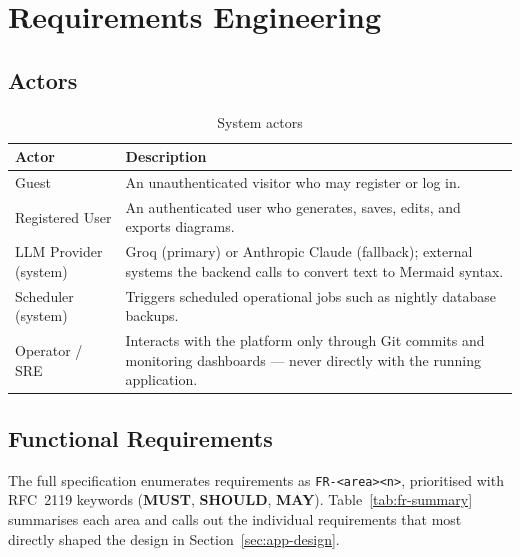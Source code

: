 \documentclass[11pt,a4paper]{article}
\newcommand{\reqid}[1]{\texttt{#1}}
\begin{document}
\section{Requirements Engineering}

\subsection{Actors}
\begin{table}[H]
\centering
\begin{tabularx}{\textwidth}{@{}l Y@{}}
\toprule
\textbf{Actor} & \textbf{Description} \\
\midrule
Guest & An unauthenticated visitor who may register or log in. \\
Registered User & An authenticated user who generates, saves, edits, and
    exports diagrams. \\
LLM Provider (system) & Groq (primary) or Anthropic Claude (fallback);
    external systems the backend calls to convert text to Mermaid syntax. \\
Scheduler (system) & Triggers scheduled operational jobs such as nightly
    database backups. \\
Operator / SRE & Interacts with the platform only through Git commits and
    monitoring dashboards --- never directly with the running application. \\
\bottomrule
\end{tabularx}
\caption{System actors}
\end{table}

\subsection{Functional Requirements}
The full specification enumerates requirements as \reqid{FR-<area><n>},
prioritised with RFC~2119 keywords (\textbf{MUST}, \textbf{SHOULD},
\textbf{MAY}). Table~\ref{tab:fr-summary} summarises each area and calls
out the individual requirements that most directly shaped the design in
Section~\ref{sec:app-design}.
\end{document}
